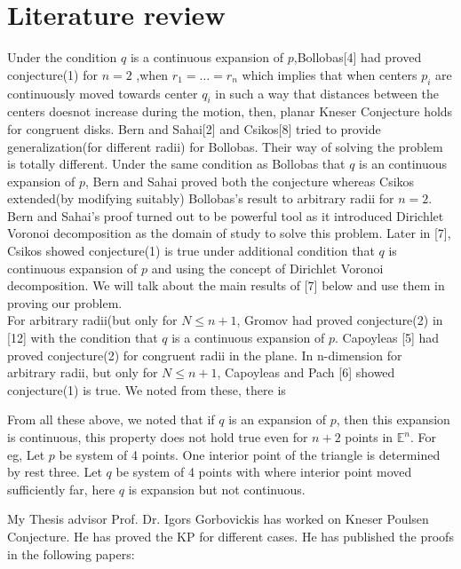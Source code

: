 \section{Literature review}
Under the condition $q$ is a continuous expansion of $p$,Bollobas[4] had proved conjecture(1) for $ n=2$ ,when $r_1= \dots =r_n$   which implies that when centers $p_i$ are continuously moved towards center $q_i$ in such a way that distances between the centers doesnot increase during the motion, then, planar Kneser Conjecture holds for congruent disks. Bern and Sahai[2] and Csikos[8] tried to provide generalization(for different radii) for Bollobas. Their way of solving the problem is totally different.  Under the same condition as Bollobas that $q$ is an continuous expansion of $p$, Bern and Sahai proved both the conjecture whereas Csikos extended(by modifying suitably) Bollobas's result to arbitrary radii for $n=2$. Bern and Sahai's proof turned out to be powerful tool as it introduced Dirichlet Voronoi decomposition as the domain of study to solve this problem. Later in [7], Csikos showed conjecture(1) is true under additional condition that $q$ is continuous expansion of $p$ and using the concept of Dirichlet Voronoi decomposition. We will talk about the main results of [7] below and use them in proving our problem.\\

For arbitrary radii(but only for $N \leq n+1 $, Gromov had proved conjecture(2) in [12] with the condition that $q$ is a continuous expansion of $p$. Capoyleas [5] had proved conjecture(2) for congruent radii in the plane. In n-dimension for arbitrary radii, but only for $N \leq n+1$, Capoyleas and Pach [6] showed conjecture(1) is true. We noted from these, there is 


From all these above, we noted that if $q$
is an expansion of $p$, then this expansion is continuous, this property does not hold true even
for $n+2$ points in $\mathbb{E}^n$. For eg, Let $p $ be system of 4 points.
One interior point of the triangle is determined by rest three. Let $q$ be system of 4 points with where interior point moved sufficiently far, here $q $ is expansion but not continuous.



My Thesis advisor Prof. Dr. Igors Gorbovickis has  worked on Kneser Poulsen Conjecture. He has proved the KP for different cases. He has published the proofs in the following papers:

